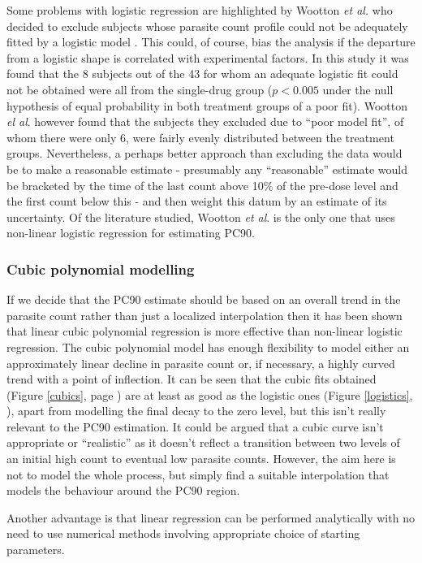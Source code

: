 Some problems with logistic regression are highlighted by Wootton {\it et al.}  who decided to exclude subjects whose parasite count profile could not be adequately fitted by a logistic model \cite{wootton}. This could, of course, bias the analysis if the departure from a logistic shape is correlated with experimental factors. In this study it was found that the 8 subjects out of the 43 for whom an adequate logistic fit could not be obtained were all from the single-drug group ($p<0.005$ under the null hypothesis of equal probability in both treatment groups of a poor fit). Wootton {\it el al}. however found that the subjects they excluded due to ``poor model fit'', of whom there were only 6, were fairly evenly distributed between the treatment groups. Nevertheless, a perhaps better approach than excluding the data would be to make a reasonable estimate - presumably any ``reasonable'' estimate would be bracketed by the time of the last count above 10\% of the pre-dose level and the first count below this - and then weight this datum by an estimate of its uncertainty. Of the literature studied, Wootton {\it et al}. is the only one that uses non-linear logistic regression for estimating PC90.

\subsubsection*{Cubic polynomial modelling}
If we decide that the PC90 estimate should be based on an overall trend in the parasite count rather than just a localized interpolation then it has been shown that linear cubic polynomial regression is more effective than non-linear logistic regression. The cubic polynomial model has enough flexibility to model either an approximately linear decline in parasite count or, if necessary, a highly curved trend with a point of inflection. It can be seen that the cubic fits obtained (Figure \ref{cubics}, page \pageref{cubics}) are at least as good as the logistic ones (Figure \ref{logistics}, \pageref{logistics}), apart from modelling the final decay to the zero level, but this isn't really relevant to the PC90 estimation. It could be argued that a cubic curve isn't appropriate or ``realistic'' as it doesn't reflect a transition between two levels of an initial high count to eventual low parasite counts. However, the aim here is not to model the whole process, but simply find a suitable interpolation that models the behaviour around the PC90 region. 

Another advantage is that linear regression can be performed analytically with no need to use numerical methods involving appropriate choice of starting parameters.

